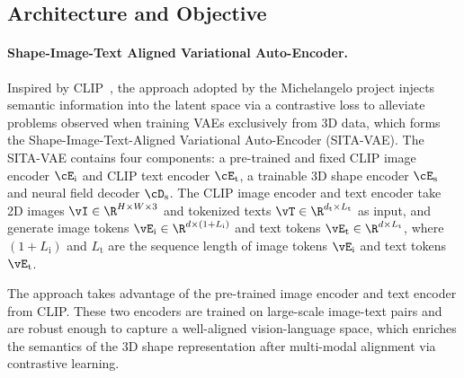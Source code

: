 \documentclass[../../book-main.tex]{subfiles}
\begin{document}
\subsection{Architecture and Objective}

\paragraph{Shape-Image-Text Aligned Variational Auto-Encoder.}
Inspired by CLIP~\citep{pmlr-v139-radford21a}, the approach adopted by
the Michelangelo project injects semantic information into the latent
space via a contrastive loss to alleviate problems observed when
training VAEs exclusively from 3D data, which forms the
Shape-Image-Text-Aligned Variational Auto-Encoder (SITA-VAE).
The SITA-VAE contains four components: a pre-trained and fixed CLIP image
encoder \(\cE_{\mathrm{i}}\) and CLIP text encoder
\(\cE_{\mathrm{t}}\), a trainable 3D shape encoder
\(\cE_{\mathrm{s}}\) and neural field decoder \(\cD_{\mathrm{s}}\).
The CLIP image encoder and text encoder take 2D images \(\vI \in \R^{H \times
W \times 3}\) and tokenized texts \(\vT \in \R^{d_{\mathrm{t}} \times
L_{\mathrm{t}}}\) as input, and generate image tokens
\(\vE_{\mathrm{i}} \in \R^{d \times (1 + L_{\mathrm{i}})}\) and text
tokens \(\vE_{\mathrm{t}} \in \R^{d \times L_{\mathrm{t}}}\), where
\((1+L_{\mathrm{i}})\) and \(L_{\mathrm{t}}\) are the sequence length of
image tokens \(\vE_{\mathrm{i}}\) and text tokens \(\vE_{\mathrm{t}}\).

The approach takes advantage of the pre-trained image encoder and
text encoder from CLIP.
These two encoders are trained on large-scale
image-text pairs and are robust enough to capture a well-aligned
vision-language space, which enriches the semantics of the 3D shape
representation after multi-modal alignment via contrastive learning.
\end{document}
